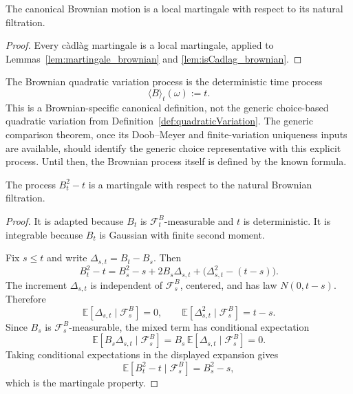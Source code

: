 \begin{lemma}\label{lem:isLocalMartingale_brownian}
  \leanok
The canonical Brownian motion is a local martingale with respect to its natural filtration.
\end{lemma}

\begin{proof}


\leanok
Every càdlàg martingale is a local martingale, applied to
Lemmas~\ref{lem:martingale_brownian} and \ref{lem:isCadlag_brownian}.
\end{proof}

\begin{definition}\label{def:brownianQuadraticVariation}
  \leanok
The Brownian quadratic variation process is the deterministic time process
\[
  \langle B\rangle_t(\omega) := t.
\]
This is a Brownian-specific canonical definition, not the generic choice-based
quadratic variation from Definition~\ref{def:quadraticVariation}.  The generic
comparison theorem, once its Doob--Meyer and finite-variation uniqueness inputs
are available, should identify the generic choice representative with this
explicit process.  Until then, the Brownian process itself is defined by the
known formula.
\end{definition}

\begin{lemma}\label{lem:martingale_brownian_sq_sub_time}
  \leanok
The process \(B_t^2-t\) is a martingale with respect to the natural Brownian filtration.
\end{lemma}

\begin{proof}


\leanok
It is adapted because \(B_t\) is \(\mathcal F^B_t\)-measurable and \(t\) is
deterministic.  It is integrable because \(B_t\) is Gaussian with finite second
moment.

Fix \(s\le t\) and write \(\Delta_{s,t}=B_t-B_s\).  Then
\[
  B_t^2-t
  = B_s^2-s + 2B_s\Delta_{s,t}
    +\bigl(\Delta_{s,t}^2-(t-s)\bigr).
\]
The increment \(\Delta_{s,t}\) is independent of \(\mathcal F^B_s\), centered,
and has law \(N(0,t-s)\).  Therefore
\[
  \mathbb E[\Delta_{s,t}\mid\mathcal F^B_s]=0,
  \qquad
  \mathbb E[\Delta_{s,t}^2\mid\mathcal F^B_s]=t-s.
\]
Since \(B_s\) is \(\mathcal F^B_s\)-measurable, the mixed term has conditional
expectation
\[
  \mathbb E[B_s\Delta_{s,t}\mid\mathcal F^B_s]
  = B_s\,\mathbb E[\Delta_{s,t}\mid\mathcal F^B_s]=0.
\]
Taking conditional expectations in the displayed expansion gives
\[
  \mathbb E[B_t^2-t\mid\mathcal F^B_s]=B_s^2-s,
\]
which is the martingale property.
\end{proof}

